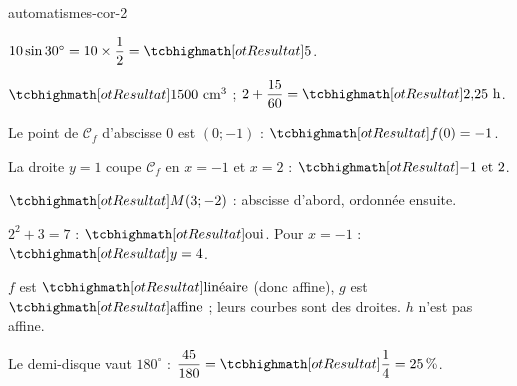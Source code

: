 \begin{blocEdition}{automatismes-cor-2}
\begin{deuxcolonnes}
\begin{questions}
\item \begin{minipage}[t]{\linewidth}\raggedright\leavevmode {}\enspace $10\sin30^\circ=10\times\dfrac12=\res5$.\end{minipage}
\item \begin{minipage}[t]{\linewidth}\raggedright\leavevmode {}\enspace $\res{1500\text{ cm}^3}$ ; $2+\dfrac{15}{60}=\res{2{,}25\text{ h}}$.\end{minipage}
\end{questions}\end{deuxcolonnes}
\begin{deuxcolonnes}\begin{questions}
\item \begin{minipage}[t]{\linewidth}\raggedright\leavevmode {}\enspace Le point de $\mathcal C_f$ d’abscisse 0 est $(0;-1)$ : $\res{f(0)=-1}$.\end{minipage}
\item \begin{minipage}[t]{\linewidth}\raggedright\leavevmode {}\enspace La droite $y=1$ coupe $\mathcal C_f$ en $x=-1$ et $x=2$ : $\res{-1\text{ et }2}$.\end{minipage}
\item \begin{minipage}[t]{\linewidth}\raggedright\leavevmode {}\enspace $\res{M(3;-2)}$ : abscisse d’abord, ordonnée ensuite.\end{minipage}
\item \begin{minipage}[t]{\linewidth}\raggedright\leavevmode {}\enspace $2^2+3=7$ : $\res{\text{oui}}$. Pour $x=-1$ : $\res{y=4}$.\end{minipage}
\item \begin{minipage}[t]{\linewidth}\raggedright\leavevmode {}\enspace $f$ est $\res{\text{linéaire}}$ (donc affine), $g$ est $\res{\text{affine}}$ ; leurs courbes sont des droites. $h$ n’est pas affine.\end{minipage}
\item \begin{minipage}[t]{\linewidth}\raggedright\leavevmode {}\enspace Le demi-disque vaut $180^\circ$ : $\dfrac{45}{180}=\res{\dfrac14=25\,\%}$.\end{minipage}

\end{questions}
\end{deuxcolonnes}
\end{blocEdition}
